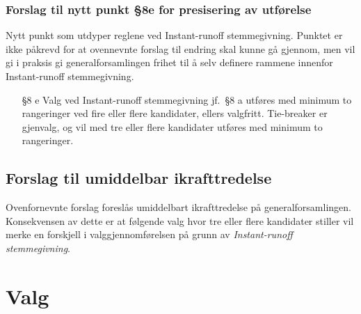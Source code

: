 \documentclass[10pt,norsk,a4paper]{article}
\begin{document}
\subsubsection{Forslag til nytt punkt §8e for presisering av utførelse}

Nytt punkt som utdyper reglene ved Instant-runoff stemmegivning. Punktet er ikke påkrevd for at ovennevnte forslag til endring skal kunne gå gjennom, men vil gi i praksis gi generalforsamlingen frihet til å selv definere rammene innenfor Instant-runoff stemmegivning.

\begin{enumerate}
	\item[§8 e] Valg ved Instant-runoff stemmegivning jf.~§8 a utføres med minimum to rangeringer ved fire eller flere kandidater, ellers valgfritt. Tie-breaker er gjenvalg, og vil med tre eller flere kandidater utføres med minimum to rangeringer.
\end{enumerate}


\subsection{Forslag til umiddelbar ikrafttredelse}

Ovenfornevnte forslag foreslås umiddelbart ikrafttredelse på generalforsamlingen.
Konsekvensen av dette er at følgende valg hvor tre eller flere kandidater stiller vil merke en forskjell i valggjennomførelsen på grunn av \textit{Instant-runoff stemmegivning}.



\section{Valg}
\end{document}
